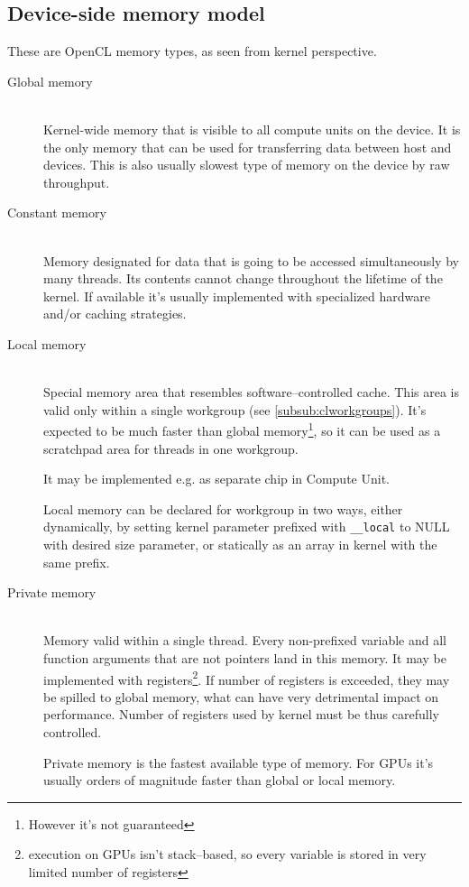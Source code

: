 \subsection{Device-side memory model}

These are OpenCL memory types, as seen from kernel perspective.

\begin{description}
  \item[Global memory] \hfill \\
    Kernel-wide memory that is visible to all compute units on the device.
    It is the only memory that can be used for transferring data between host and
    devices. This is also usually slowest type of memory on the device by raw
    throughput.
  \item[Constant memory] \hfill \\
    Memory designated for data that is going to be accessed simultaneously by
    many threads. Its contents cannot change throughout the lifetime of the
    kernel. If available it's usually implemented with specialized hardware
    and/or caching strategies.
  \item[Local memory] \hfill \\
    Special memory area that resembles software--controlled cache. This area is
    valid only within a single workgroup (see \autoref{subsub:clworkgroups}). It's
    expected to be much faster than global memory\footnote{However it's not guaranteed},
    so it can be used as a scratchpad area for threads in one workgroup.

    It may be implemented e.g. as separate chip in Compute Unit.

    Local memory can be declared for workgroup in two ways, either dynamically,
    by setting kernel parameter prefixed with \texttt{\_\_local} to NULL with
    desired size parameter, or statically as an array in kernel with the same
    prefix.

  \item[Private memory] \hfill \\
    Memory valid within a single thread. Every non-prefixed variable and all function
    arguments that are not pointers land in this memory. It may be implemented
    with registers\footnote{execution on GPUs isn't stack--based, so every variable
    is stored in very limited number of registers}. If number of registers is
    exceeded, they may be spilled to global memory, what can have very
    detrimental impact on performance. Number of registers used by kernel must
    be thus carefully controlled.

    Private memory is the fastest available type of memory. For GPUs it's usually
    orders of magnitude faster than global or local memory.
\end{description}


